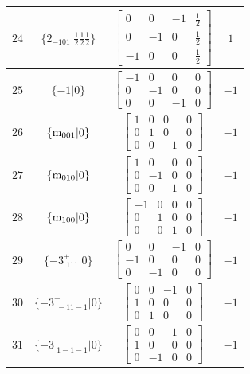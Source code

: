 \documentclass[fleqn,8pt]{jsarticle}
\begin{document}
\begin{longtable}{cccc}
$ 24 $ & $ \{2{}_{-101}|\frac{1}{2} \frac{1}{2} \frac{1}{2}\} $ & $ \begin{bmatrix} 0 & 0 & -1 & \frac{1}{2} \\ 0 & -1 & 0 & \frac{1}{2} \\ -1 & 0 & 0 & \frac{1}{2} \end{bmatrix} $ & $ 1 $ \\ \hline
$ 25 $ & $ \{-1|0\} $ & $ \begin{bmatrix} -1 & 0 & 0 & 0 \\ 0 & -1 & 0 & 0 \\ 0 & 0 & -1 & 0 \end{bmatrix} $ & $ -1 $ \\ \hline
$ 26 $ & $ \{{\rm m}_{001}|0\} $ & $ \begin{bmatrix} 1 & 0 & 0 & 0 \\ 0 & 1 & 0 & 0 \\ 0 & 0 & -1 & 0 \end{bmatrix} $ & $ -1 $ \\ \hline
$ 27 $ & $ \{{\rm m}_{010}|0\} $ & $ \begin{bmatrix} 1 & 0 & 0 & 0 \\ 0 & -1 & 0 & 0 \\ 0 & 0 & 1 & 0 \end{bmatrix} $ & $ -1 $ \\ \hline
$ 28 $ & $ \{{\rm m}_{100}|0\} $ & $ \begin{bmatrix} -1 & 0 & 0 & 0 \\ 0 & 1 & 0 & 0 \\ 0 & 0 & 1 & 0 \end{bmatrix} $ & $ -1 $ \\ \hline
$ 29 $ & $ \{-3^{+}_{\,\,111}|0\} $ & $ \begin{bmatrix} 0 & 0 & -1 & 0 \\ -1 & 0 & 0 & 0 \\ 0 & -1 & 0 & 0 \end{bmatrix} $ & $ -1 $ \\ \hline
$ 30 $ & $ \{-3^{+}_{\,\,-11-1}|0\} $ & $ \begin{bmatrix} 0 & 0 & -1 & 0 \\ 1 & 0 & 0 & 0 \\ 0 & 1 & 0 & 0 \end{bmatrix} $ & $ -1 $ \\ \hline
$ 31 $ & $ \{-3^{+}_{\,\,1-1-1}|0\} $ & $ \begin{bmatrix} 0 & 0 & 1 & 0 \\ 1 & 0 & 0 & 0 \\ 0 & -1 & 0 & 0 \end{bmatrix} $ & $ -1 $ \\ \hline

\end{longtable}
\end{document}
